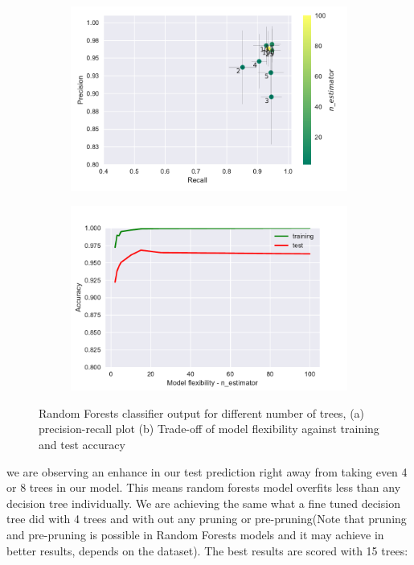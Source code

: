 \documentclass[12pt, a4paper]{scrartcl}
\begin{document}
\begin{figure}[h]
    \centering
    \begin{subfigure}{0.45\textwidth}
        \includegraphics[width=\textwidth]{prec_recall_rf}
        \caption{}
        \label{fig:prec_recall_rf}
    \end{subfigure}
    \begin{subfigure}{0.45\textwidth}
        \includegraphics[width=\textwidth]{tradeoff_rf}
        \caption{}
        \label{fig:tradeoff_rf}
    \end{subfigure}
    \caption{Random Forests classifier output for different number of trees, (a) precision-recall plot (b) Trade-off of model flexibility against training and test accuracy}\label{fig:RF}
\end{figure}

we are observing an enhance in our test prediction right away from taking even 4 or 8 trees in our model. This means random forests model overfits less than any decision tree individually. We are achieving the same what a fine tuned decision tree did with 4 trees and with out any pruning or pre-pruning(Note that pruning and pre-pruning is possible in Random Forests models and it may achieve in better results, depends on the dataset). The best results are scored with 15 trees:
\end{document}
